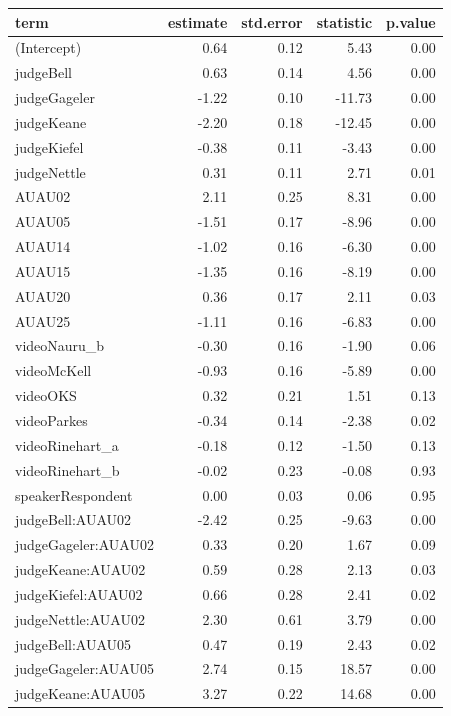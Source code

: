 \documentclass{monashthesis}
\begin{document}
\begin{tabular}{l|r|r|r|r}
\hline
term & estimate & std.error & statistic & p.value\\
\hline
(Intercept) & 0.64 & 0.12 & 5.43 & 0.00\\
\hline
judgeBell & 0.63 & 0.14 & 4.56 & 0.00\\
\hline
judgeGageler & -1.22 & 0.10 & -11.73 & 0.00\\
\hline
judgeKeane & -2.20 & 0.18 & -12.45 & 0.00\\
\hline
judgeKiefel & -0.38 & 0.11 & -3.43 & 0.00\\
\hline
judgeNettle & 0.31 & 0.11 & 2.71 & 0.01\\
\hline
AUAU02 & 2.11 & 0.25 & 8.31 & 0.00\\
\hline
AUAU05 & -1.51 & 0.17 & -8.96 & 0.00\\
\hline
AUAU14 & -1.02 & 0.16 & -6.30 & 0.00\\
\hline
AUAU15 & -1.35 & 0.16 & -8.19 & 0.00\\
\hline
AUAU20 & 0.36 & 0.17 & 2.11 & 0.03\\
\hline
AUAU25 & -1.11 & 0.16 & -6.83 & 0.00\\
\hline
videoNauru\_b & -0.30 & 0.16 & -1.90 & 0.06\\
\hline
videoMcKell & -0.93 & 0.16 & -5.89 & 0.00\\
\hline
videoOKS & 0.32 & 0.21 & 1.51 & 0.13\\
\hline
videoParkes & -0.34 & 0.14 & -2.38 & 0.02\\
\hline
videoRinehart\_a & -0.18 & 0.12 & -1.50 & 0.13\\
\hline
videoRinehart\_b & -0.02 & 0.23 & -0.08 & 0.93\\
\hline
speakerRespondent & 0.00 & 0.03 & 0.06 & 0.95\\
\hline
judgeBell:AUAU02 & -2.42 & 0.25 & -9.63 & 0.00\\
\hline
judgeGageler:AUAU02 & 0.33 & 0.20 & 1.67 & 0.09\\
\hline
judgeKeane:AUAU02 & 0.59 & 0.28 & 2.13 & 0.03\\
\hline
judgeKiefel:AUAU02 & 0.66 & 0.28 & 2.41 & 0.02\\
\hline
judgeNettle:AUAU02 & 2.30 & 0.61 & 3.79 & 0.00\\
\hline
judgeBell:AUAU05 & 0.47 & 0.19 & 2.43 & 0.02\\
\hline
judgeGageler:AUAU05 & 2.74 & 0.15 & 18.57 & 0.00\\
\hline
judgeKeane:AUAU05 & 3.27 & 0.22 & 14.68 & 0.00\\

\end{tabular}
\end{document}
